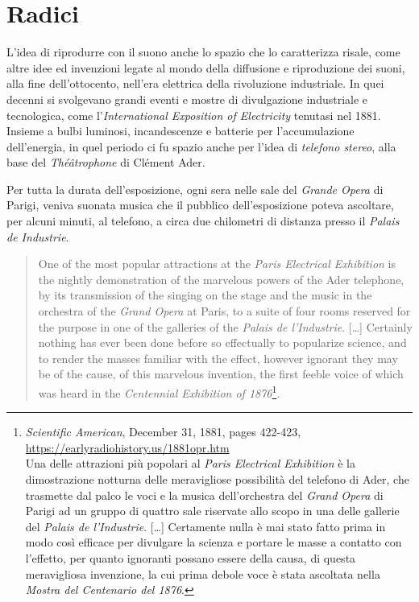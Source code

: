 \section{Radici}

L'idea di riprodurre con il suono anche lo spazio che lo caratterizza risale,
come altre idee ed invenzioni legate al mondo della diffusione e riproduzione
dei suoni, alla fine dell'ottocento, nell'era elettrica della rivoluzione
industriale. In quei decenni si svolgevano grandi eventi e mostre di divulgazione
industriale e tecnologica,
come l'\emph{International Exposition of Electricity} tenutasi nel 1881.
Insieme a bulbi luminosi, incandescenze e batterie per l'accumulazione
dell'energia, in quel periodo ci fu spazio anche per l'idea di \emph{telefono stereo},
alla base del \emph{Théâtrophone} di Clément Ader.

Per tutta la durata dell'esposizione, ogni sera nelle sale del \emph{Grande Opera}
di Parigi, veniva suonata musica che il pubblico dell'esposizione poteva ascoltare,
per alcuni minuti, al telefono, a circa due chilometri di distanza presso
il \emph{Palais de Industrie}.

\begin{quote}
One of the most popular attractions at the \emph{Paris Electrical Exhibition} is
the nightly demonstration of the marvelous powers of the Ader telephone, by its
transmission of the singing on the stage and the music in the orchestra of the
\emph{Grand Opera} at Paris, to a suite of four rooms reserved for the purpose
in one of the galleries of the \emph{Palais de l'Industrie}. [\ldots] Certainly
nothing has ever been done before so effectually to popularize science, and to
render the masses familiar with the effect, however ignorant they may be of the
cause, of this marvelous invention, the first feeble voice of which was heard in
the \emph{Centennial Exhibition of 1876}\footnote{ \emph{Scientific American},
December 31, 1881, pages 422-423,\\ \url{https://earlyradiohistory.us/1881opr.htm}\\
Una delle attrazioni più popolari al \emph{Paris Electrical Exhibition} è la
dimostrazione notturna delle meravigliose possibilità del telefono di Ader,
che trasmette dal palco le voci e la musica dell'orchestra del \emph{Grand Opera}
di Parigi ad un gruppo di quattro sale riservate allo scopo in una delle gallerie
del \emph{Palais de l'Industrie}. [\ldots] Certamente nulla è mai stato fatto
prima in modo così efficace per divulgare la scienza e portare le masse a contatto
con l'effetto, per quanto ignoranti possano essere della causa, di questa
meravigliosa invenzione, la cui prima debole voce è stata ascoltata nella
\emph{Mostra del Centenario del 1876}.}.
\end{quote}

